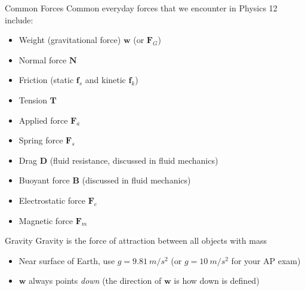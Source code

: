 \documentclass[12pt,compress,aspectratio=169]{beamer}
\begin{document}
\begin{frame}{Common Forces}
  Common everyday forces that we encounter in Physics 12 include:
  \begin{itemize}
  \item Weight (gravitational force) $\bm{w}$ (or $\bm{F}_G$)
  \item Normal force $\bm{N}$
  \item Friction (static $\bm{f}_s$ and kinetic $\bm{f}_k$)
  \item Tension $\bm{T}$
  \item Applied force $\bm{F}_a$
  \item Spring force $\bm{F}_s$
  \item Drag $\bm{D}$ (fluid resistance, discussed in fluid mechanics)
  \item Buoyant force $\bm{B}$ (discussed in fluid mechanics)
  \item Electrostatic force $\bm{F}_e$
  \item Magnetic force $\bm{F}_m$
  \end{itemize}
\end{frame}



\begin{frame}{Gravity}
  Gravity is the force of attraction between all objects with mass
    
  \begin{itemize}
  \item\vspace{-.15in}Near surface of Earth, use $g=\SI{9.81}{m/s^2}$ (or
    $g=\SI{10}{m/s^2}$ for your AP exam)
  \item $\bm{w}$ always points \emph{down} (the direction of $\bm{w}$ is how
    down is defined)
%
  \end{itemize}    
\end{frame}
\end{document}

